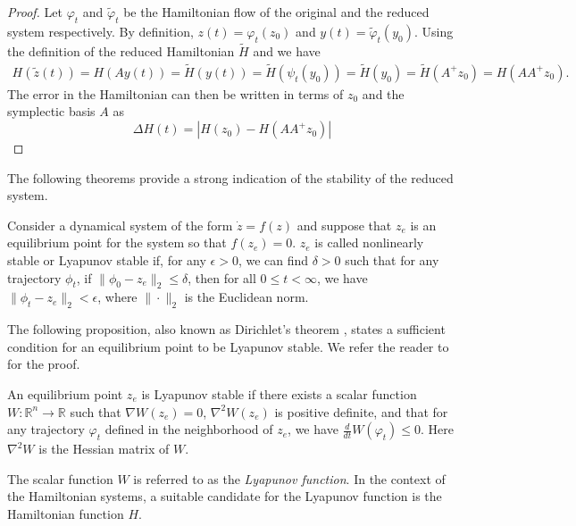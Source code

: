 \begin{proof}
	Let $\varphi_t$ and $\tilde \varphi_t$ be the Hamiltonian flow of the original and the reduced system respectively. By definition, $ z(t) = \varphi_t(z_0)$ and $ y(t) = \tilde \varphi_t(y_0)$. Using the definition of the reduced Hamiltonian $\tilde H$ and  we have
\begin{equation} \label{p1.eq:SyMo:6}
\begin{aligned}
	H(\tilde{{z}} (t)) = H( A y (t) ) = \tilde H( y (t)) = \tilde H(\psi_t( y_0)) = \tilde H( y_0) = \tilde H(A^+  z_0) = H(AA^+ z_0).
\end{aligned}
\end{equation}
The error in the Hamiltonian can then be written in terms of $z_0$ and the symplectic basis $A$ as
\begin{equation} \label{p1.eq:SyMo:7}
	\Delta H(t) = |H(z_0) - H(AA^+ z_0)|
\end{equation}
\end{proof}
The following theorems provide a strong indication of the stability of the reduced system.

\begin{definition} \label{p1.definition:SyMo:1} \cite{bhatia2002stability}
Consider a dynamical system of the form $\dot{z} = f(z)$ and suppose that $z_e$ is an equilibrium point for the system so that $f(z_e) = 0$. $ z_e$ is called nonlinearly stable or Lyapunov stable if, for any $\epsilon > 0$, we can find $\delta > 0$ such that for any trajectory $\phi_t$, if $\| \phi_0 -  z_e \|_2 \leq \delta$, then for all $0 \leq t < \infty$, we have $\| \phi_t -  z_e \|_2 < \epsilon$, where $\| \cdot \|_2$ is the Euclidean norm.
\end{definition}	
The following proposition, also known as Dirichlet's theorem \cite{bhatia2002stability}, states a sufficient condition for an equilibrium point to be Lyapunov stable. We refer the reader to \cite{bhatia2002stability} for the proof.
\begin{proposition} \label{p1.proposition:SyMo:1} \cite{bhatia2002stability}
An equilibrium point $ z_e$ is Lyapunov stable if there exists a scalar function $W : \mathbb R^{n} \to  \mathbb R$ such that $\nabla W( z_e) = 0$, $\nabla^2 W(z_e)$ is positive definite, and that for any trajectory $\varphi_t$ defined in the neighborhood of $ z_e$, we have $\frac{d}{dt} W(\varphi_t) \leq 0$. Here $\nabla^2W$ is the Hessian matrix of $W$.
\end{proposition}
The scalar function $W$ is referred to as the \emph{Lyapunov function}. In the context of the Hamiltonian systems, a suitable candidate for the Lyapunov function is the Hamiltonian function $H$. %

